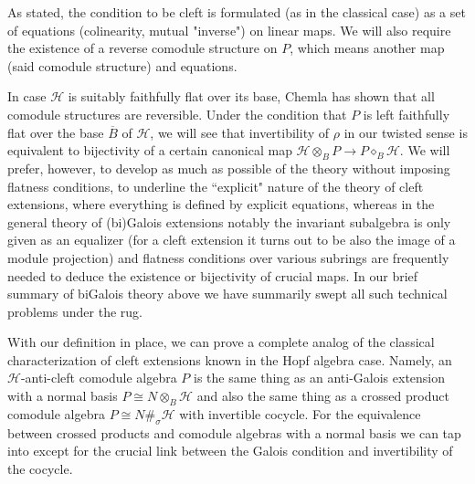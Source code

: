 \documentclass[a4paper,reqno]{amsart}
\numberwithin{equation}{section}
\theoremstyle{plain}
\theoremstyle{remark}
\numberwithin{equation}{section}
\newcommand\ol{\overline}
\newcommand{\di}{{\diamond_{B}}}
\newcommand\ou[1]{\otimes_{#1}}
\newcommand{\CH}{\mathcal{H}}
\begin{document}
As stated, the condition to be cleft 
is formulated (as in the classical case) as a set of equations (colinearity, mutual "inverse") on linear maps. We will also require the existence of a reverse comodule structure on $P$, which means another map (said comodule structure) and equations.

In case $\CH$ is suitably faithfully flat over its base, Chemla \cite{C20} has shown that all comodule structures are reversible. Under the condition that $P$ is left faithfully flat over the base $\ol B$ of $\CH$, we will see that invertibility of $\rho$ in our twisted sense is equivalent to bijectivity of a certain canonical map $\CH\ou B P\to P\di\CH.$ We will prefer, however, to develop as much as possible of the theory without imposing flatness conditions, to underline the ``explicit" nature of the theory of cleft extensions, where everything is defined by explicit equations, whereas in the general theory of (bi)Galois extensions notably the invariant subalgebra is only given as an equalizer (for a cleft extension it turns out to be also the image of a module projection) and flatness conditions over various subrings are frequently needed to deduce the existence or bijectivity of crucial maps. In our brief summary of biGalois theory above we have summarily swept all such technical problems
under the rug.

With our definition in place, we can prove a complete analog of the classical characterization of cleft extensions known in the Hopf algebra case. Namely, an $\CH$-anti-cleft comodule algebra $P$ is the same thing as an anti-Galois extension with a normal basis $P\cong N\ou B\CH$ and also the same thing as a crossed product comodule algebra $P\cong N\#_\sigma\CH$ with invertible cocycle. For the equivalence between crossed products and comodule algebras with a normal basis we can tap into \cite{BB} except for the crucial link between the Galois condition and invertibility of the cocycle.
\end{document}
